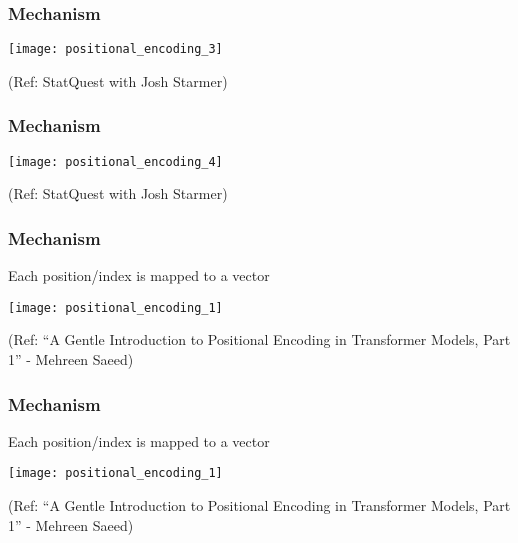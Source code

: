 \begin{frame}[fragile]\frametitle{Mechanism}


\begin{center}
\texttt{[image: positional\_encoding\_3]}


{\tiny (Ref: StatQuest with Josh Starmer)}
\end{center}		

\end{frame}

\begin{frame}[fragile]\frametitle{Mechanism}


\begin{center}
\texttt{[image: positional\_encoding\_4]}


{\tiny (Ref: StatQuest with Josh Starmer)}
\end{center}		

\end{frame}

\begin{frame}[fragile]\frametitle{Mechanism}

Each position/index is mapped to a vector

\begin{center}
\texttt{[image: positional\_encoding\_1]}


{\tiny (Ref: ``A Gentle Introduction to Positional Encoding in Transformer Models, Part 1'' - Mehreen Saeed)}
\end{center}		

\end{frame}


\begin{frame}[fragile]\frametitle{Mechanism}

Each position/index is mapped to a vector

\begin{center}
\texttt{[image: positional\_encoding\_1]}


{\tiny (Ref: ``A Gentle Introduction to Positional Encoding in Transformer Models, Part 1'' - Mehreen Saeed)}
\end{center}		

\end{frame}

